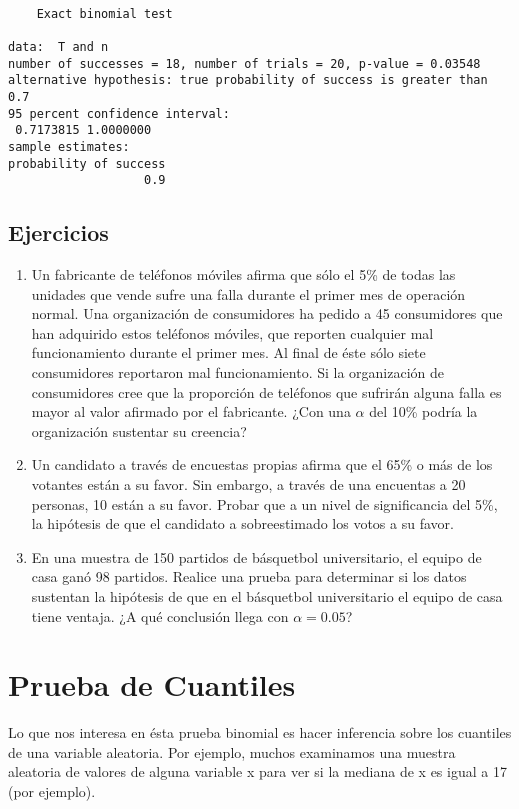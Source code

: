 \documentclass[a4paper,oneside,openany]{book}
\begin{document}
\begin{verbatim}

    Exact binomial test

data:  T and n
number of successes = 18, number of trials = 20, p-value = 0.03548
alternative hypothesis: true probability of success is greater than 0.7
95 percent confidence interval:
 0.7173815 1.0000000
sample estimates:
probability of success 
                   0.9 
\end{verbatim}

\section{Ejercicios}\label{ejercicios}

\begin{enumerate}
\def\labelenumi{\arabic{enumi}.}
\item
  Un fabricante de teléfonos móviles afirma que sólo el 5\% de todas las
  unidades que vende sufre una falla durante el primer mes de operación
  normal. Una organización de consumidores ha pedido a 45 consumidores
  que han adquirido estos teléfonos móviles, que reporten cualquier mal
  funcionamiento durante el primer mes. Al final de éste sólo siete
  consumidores reportaron mal funcionamiento. Si la organización de
  consumidores cree que la proporción de teléfonos que sufrirán alguna
  falla es mayor al valor afirmado por el fabricante. ¿Con una
  \(\alpha\) del 10\% podría la organización sustentar su creencia?
\item
  Un candidato a través de encuestas propias afirma que el 65\% o más de
  los votantes están a su favor. Sin embargo, a través de una encuentas
  a 20 personas, 10 están a su favor. Probar que a un nivel de
  significancia del 5\%, la hipótesis de que el candidato a
  sobreestimado los votos a su favor.
\item
  En una muestra de 150 partidos de básquetbol universitario, el equipo
  de casa ganó 98 partidos. Realice una prueba para determinar si los
  datos sustentan la hipótesis de que en el básquetbol universitario el
  equipo de casa tiene ventaja. ¿A qué conclusión llega con
  \(\alpha= 0.05\)?
\end{enumerate}

\chapter{Prueba de Cuantiles}\label{prueba-de-cuantiles}

Lo que nos interesa en ésta prueba binomial es hacer inferencia sobre
los cuantiles de una variable aleatoria. Por ejemplo, muchos examinamos
una muestra aleatoria de valores de alguna variable x para ver si la
mediana de x es igual a 17 (por ejemplo).
\end{document}
